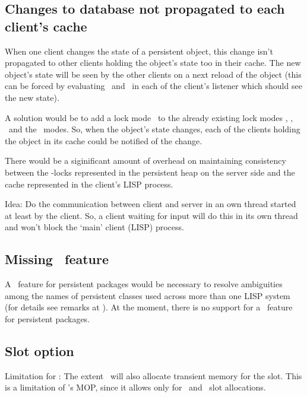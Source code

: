 \subsection{Changes to database not propagated to each client's cache}

When one client changes the state of a persistent object, this change
isn't propagated to other clients holding the object's state too in
their cache. The new object's state will be seen by the other
clients on a next reload of the object (this can be forced by
evaluating \ and \ in each of the client's listener which should see the
new state).

A solution would be to add a lock mode \ to the already
existing lock modes , , \ and
the \ modes. So, when the object's state changes,
each of the clients holding the object in its cache could be notified
of the change.

There would be a siginificant amount of overhead on maintaining
consistency between the -locks represented in the
persistent heap on the server side and the cache represented in the
client's LISP process.

Idea: Do the communication between client and server in an own thread
started at least by the client. So, a client waiting for input will do
this in its own thread and won't block the `main' client (LISP)
process.

\subsection[Missing `use-package' feature]{Missing
  \protect{}\ feature}%
\label{sec:MissingUsePackage}

A \ feature for persistent packages would be
necessary to resolve ambiguities among the names of persistent classes
used across more than one LISP system (for details see remarks at
). At the moment, there is no support for a
\ feature for persistent packages.

\subsection[Slot option :extent :persistent]{Slot option
  \protect{}\protect\lisp{\ %
    }\protect{}}

Limitation for \allegro: The extent \ will also
allocate transient memory for the slot.  This is a limitation of
\allegro's MOP, since it allows only for \ and
\ slot allocations.

